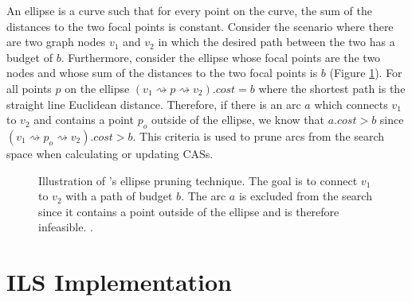 \documentclass[honors]{union-cs-thesis}
\newcommand{\spa}{\rightsquigarrow}
\begin{document}
An ellipse is a curve such that for every point on the curve, the sum of the distances to the two focal points is constant. Consider the scenario where there are two graph nodes $v_1$ and $v_2$ in which the desired path between the two has a budget of $b$. Furthermore, consider the ellipse whose focal points are the two nodes and whose sum of the distances to the two focal points is $b$ (Figure \ref{fig:ellipse}). For all points $p$ on the ellipse $(v_1 \spa p \spa v_2).cost = b$ where the shortest path is the straight line Euclidean distance. Therefore, if there is an arc $a$ which connects $v_1$ to $v_2$ and contains a point $p_o$ outside of the ellipse, we know that $a.cost > b$ since $(v_1 \spa p_o \spa v_2).cost > b$. This criteria is used to prune arcs from the search space when calculating or updating CASs.

\begin{figure}[!h]
\begin{center}
\end{center}
\caption{Illustration of \citeauthor{lu2015arc}'s ellipse pruning technique. The goal is to connect $v_1$ to $v_2$ with a path of budget $b$. The arc $a$ is excluded from the search since it contains a point outside of the ellipse and is therefore infeasible. \cite{lu2015arc}.}
\label{fig:ellipse}
\end{figure}



\section{ILS Implementation}
\end{document}
